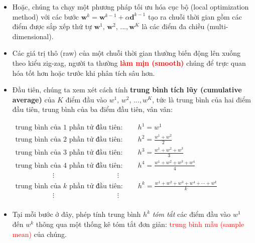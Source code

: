 \documentclass{book}
\begin{document}
\begin{itemize}
    \item Hoặc, chúng ta chạy một phương pháp tối ưu hóa cục bộ (local optimization method) với các bước $\mathbf{w}^k = \mathbf{w}^{k-1} + \alpha \mathbf{d}^{k-1}$ tạo ra chuỗi thời gian gồm các điểm được sắp xếp thứ tự $\mathbf{w}^{1},\,\mathbf{w}^{2},\,...,\mathbf{w}^{K}$ là các điểm đa chiều (multi-dimensional).
    \item Các giá trị thô (raw) của một chuỗi thời gian thường biến động lên xuống theo kiểu zig-zag, người ta thường \textbf{\textcolor{red}{làm mịn (smooth)}} chúng để trực quan hóa tốt hơn hoặc trước khi phân tích sâu hơn.
    \item Đầu tiên, chúng ta xem xét cách tính \textbf{trung bình tích lũy (cumulative average)} của $K$ điểm đầu vào $w^1,\,w^2,\,...,w^K$, tức là trung bình của hai điểm đầu tiên, trung bình của ba điểm đầu tiên, vân vân:
    \begin{center}
        $\begin{array}{ll}
        \text{trung bình của $1$ phần tử đầu tiên:} \,\,\,\,\,\,\,\,\,\,\,\,\, h^1 = w^1 \\
        \text{trung bình của $2$ phần tử đầu tiên:} \,\,\,\,\,\,\,\,\,\,\,\,\, h^2 = \frac{w^1 + w^2}{2} \\
        \text{trung bình của $3$ phần tử đầu tiên:} \,\,\,\,\,\,\,\,\,\,\,\,\, h^3 = \frac{w^1 + w^2 + w^3}{3} \\
        \text{trung bình của $4$ phần tử đầu tiên:} \,\,\,\,\,\,\,\,\,\,\,\,\, h^4 = \frac{w^1 + w^2 + w^3 + w^4}{4} \\
        \,\,\,\,\,\,\,\,\,\,\,\,\,\,\,\,\,\,\,\,\,\,\,\,\,\,\,\,\,\,\,\, \vdots \,\,\,\,\,\,\,\,\,\,\,\,\,\,\,\,\,\,\,\,\,\,\,\,\,\,\,\,\,\,\,\,\,\,\,\,\,\,\,\,\,\,\,\,\,\,\,\,\,\,\,\,\,\, \vdots \\
        \text{trung bình của $k$ phần tử đầu tiên:} \,\,\,\,\,\,\,\,\,\,\,\,\, h^{k} = \frac{w^1 + w^2 + w^3 + w^4 + \cdots  + w^k}{k} \\
        \,\,\,\,\,\,\,\,\,\,\,\,\,\,\,\,\,\,\,\,\,\,\,\,\,\,\,\,\,\,\,\, \vdots \,\,\,\,\,\,\,\,\,\,\,\,\,\,\,\,\,\,\,\,\,\,\,\,\,\,\,\,\,\,\,\,\,\,\,\,\,\,\,\,\,\,\,\,\,\,\,\,\,\,\,\,\,\, \vdots \\
        \end{array}$
    \end{center}
    \item Tại mỗi bước ở đây, phép tính trung bình $h^k$ \textit{tóm tắt} các điểm đầu vào $w^1$ đến $w^k$ thông qua một thống kê tóm tắt đơn giản: \textcolor{red}{trung bình mẫu (sample mean)} của chúng.

\end{itemize}
\end{document}
